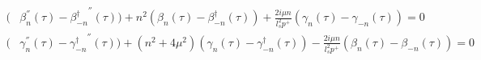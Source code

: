 \begin{equation}
\begin{aligned}
(& \beta_n^{''}(\tau) - {\beta_{-n}^\dagger}^{''}(\tau)) 
   + n^2 (\beta_n(\tau) - {\beta_{-n}^\dagger}(\tau))
   + \frac{2 i \mu n}{l_s^2 p^+}  (\gamma_n(\tau) - \gamma_{-n}(\tau)) = 0 \\
(& \gamma_n^{''}(\tau) - {\gamma_{-n}^\dagger}^{''}(\tau)) 
   + (n^2+4\mu^2) (\gamma_n(\tau) - {\gamma_{-n}^\dagger}(\tau))
   - \frac{2 i \mu n}{l_s^2 p^+}  (\beta_n(\tau) - \beta_{-n}(\tau)) = 0
\end{aligned}
\end{equation}

